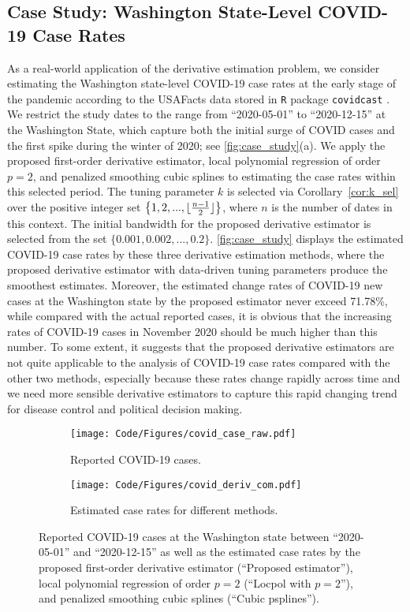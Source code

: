 \documentclass{uwstat572}
\theoremstyle{definition}
\DeclarePairedDelimiter\floor{\lfloor}{\rfloor}
\theoremstyle{theorem}
\begin{document}
\subsection{Case Study: Washington State-Level COVID-19 Case Rates}
\label{App:case_study}

As a real-world application of the derivative estimation problem, we consider estimating the Washington state-level COVID-19 case rates at the early stage of the pandemic according to the USAFacts data stored in \texttt{R} package \texttt{covidcast} \citep{reinhart2021open}. We restrict the study dates to the range from ``2020-05-01'' to ``2020-12-15'' at the Washington State, which capture both the initial surge of COVID cases and the first spike during the winter of 2020; see \autoref{fig:case_study}(a). We apply the proposed first-order derivative estimator, local polynomial regression of order $p=2$, and penalized smoothing cubic splines to estimating the case rates within this selected period. The tuning parameter $k$ is selected via Corollary~\ref{cor:k_sel} over the positive integer set $\left\{1,2,...,\floor{\frac{n-1}{2}}\right\}$, where $n$ is the number of dates in this context. The initial bandwidth for the proposed derivative estimator is selected from the set $\{0.001, 0.002,...,0.2\}$. \autoref{fig:case_study} displays the estimated COVID-19 case rates by these three derivative estimation methods, where the proposed derivative estimator with data-driven tuning parameters produce the smoothest estimates. Moreover, the estimated change rates of COVID-19 new cases at the Washington state by the proposed estimator never exceed 71.78\%, while compared with the actual reported cases, it is obvious that the increasing rates of COVID-19 cases in November 2020 should be much higher than this number. To some extent, it suggests that the proposed derivative estimators are not quite applicable to the analysis of COVID-19 case rates compared with the other two methods, especially because these rates change rapidly across time and we need more sensible derivative estimators to capture this rapid changing trend for disease control and political decision making.

\begin{figure}[!t]
	\captionsetup[subfigure]{justification=centering}
	\begin{subfigure}[t]{0.49\linewidth}
		\centering
		\texttt{[image: Code/Figures/covid\_case\_raw.pdf]}
		\caption{Reported COVID-19 cases.}
	\end{subfigure}
	\hfil
	\begin{subfigure}[t]{0.49\linewidth}
		\centering
		\texttt{[image: Code/Figures/covid\_deriv\_com.pdf]}
		\caption{Estimated case rates for different methods.}
	\end{subfigure}
	\caption{Reported COVID-19 cases at the Washington state between ``2020-05-01'' and ``2020-12-15'' as well as the estimated case rates by the proposed first-order derivative estimator (``Proposed estimator''), local polynomial regression of order $p=2$ (``Locpol with $p=2$''), and penalized smoothing cubic splines (``Cubic psplines'').}
	\label{fig:case_study}
\end{figure}
\end{document}

